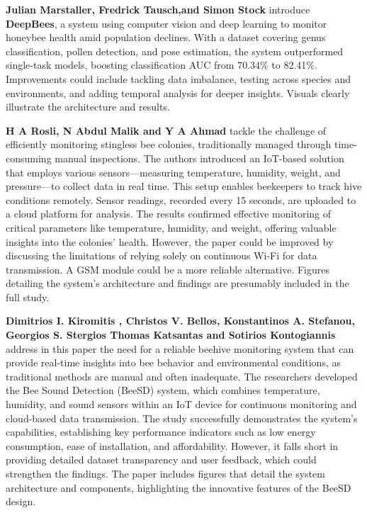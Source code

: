 \documentclass[12pt]{article}
\begin{document}
	
	
	\noindent \textbf{Julian Marstaller, Fredrick Tausch,and Simon Stock}
	\cite{marstaller2019deepbees} introduce \textbf{DeepBees}, a system using computer vision and deep learning to monitor honeybee health amid population declines. With a dataset covering genus classification, pollen detection, and pose estimation, the system outperformed single-task models, boosting classification AUC from 70.34\% to 82.41\%. Improvements could include tackling data imbalance, testing across species and environments, and adding temporal analysis for deeper insights. Visuals clearly illustrate the architecture and results. \newpage
	
	\noindent \textbf{H A Rosli, N Abdul Malik and Y A Ahmad} \cite{rosli2022iot} tackle the challenge of efficiently monitoring stingless bee colonies, traditionally managed through time-consuming manual inspections. The authors introduced an IoT-based solution that employs various sensors—measuring temperature, humidity, weight, and pressure—to collect data in real time. This setup enables beekeepers to track hive conditions remotely. Sensor readings, recorded every 15 seconds, are uploaded to a cloud platform for analysis. The results confirmed effective monitoring of critical parameters like temperature, humidity, and weight, offering valuable insights into the colonies' health. However, the paper could be improved by discussing the limitations of relying solely on continuous Wi-Fi for data transmission. A GSM module could be a more reliable alternative. Figures detailing the system's architecture and findings are presumably included in the full study.\\ \newline
	
	
	\noindent \textbf{Dimitrios I. Kiromitis , Christos V. Bellos, Konstantinos A. Stefanou, Georgios S. Stergios Thomas Katsantas  and Sotirios Kontogiannis} \cite{kiromitis2022bee} address in this paper the need for a reliable beehive monitoring system that can provide real-time insights into bee behavior and environmental conditions, as traditional methods are manual and often inadequate. The researchers developed the Bee Sound Detection (BeeSD) system, which combines temperature, humidity, and sound sensors within an IoT device for continuous monitoring and cloud-based data transmission. The study successfully demonstrates the system’s capabilities, establishing key performance indicators such as low energy consumption, ease of installation, and affordability. However, it falls short in providing detailed dataset transparency and user feedback, which could strengthen the findings. The paper includes figures that detail the system architecture and components, highlighting the innovative features of the BeeSD design. \\ \newline 
	
\end{document}
